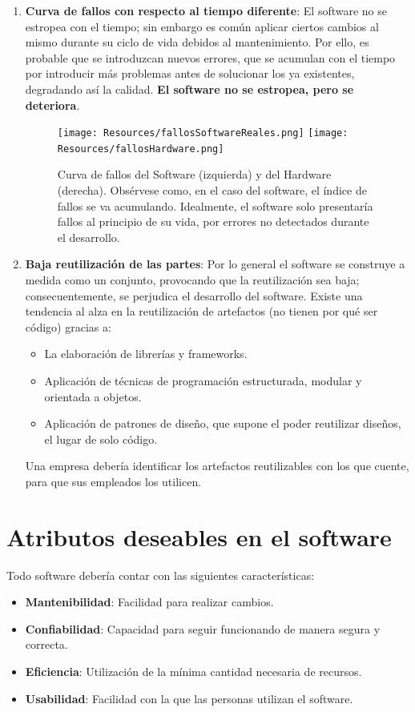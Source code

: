 \begin{enumerate}
    \item \textbf{Curva de fallos con respecto al tiempo diferente}:
          El software no se estropea con el tiempo; sin embargo es común aplicar ciertos cambios al mismo durante su ciclo de vida debidos al mantenimiento. Por ello, es probable que se introduzcan nuevos errores, que se acumulan con el tiempo por introducir más problemas antes de solucionar los ya existentes, degradando así la calidad. \textbf{El software no se estropea, pero se deteriora}.
          \begin{figure}[h]
            \centering
            \texttt{[image: Resources/fallosSoftwareReales.png]}
            \texttt{[image: Resources/fallosHardware.png]}
            \caption{Curva de fallos del Software (izquierda) y del Hardware (derecha). Obsérvese como, en el caso del software, el índice de fallos se va acumulando. Idealmente, el software solo presentaría fallos al principio de su vida, por errores no detectados durante el desarrollo.}
        \end{figure}
    \item \textbf{Baja reutilización de las partes}:
          Por lo general el software se construye a medida como un conjunto, provocando que la reutilización sea baja; consecuentemente, se perjudica el desarrollo del software. Existe una tendencia al alza en la reutilización de artefactos (no tienen por qué ser código) gracias a:
          \begin{itemize}
              \item La elaboración de librerías y frameworks.
              \item Aplicación de técnicas de programación estructurada, modular y orientada a objetos.
              \item Aplicación de patrones de diseño, que supone el poder reutilizar diseños, el lugar de solo código.
          \end{itemize}
          Una empresa debería identificar los artefactos reutilizables con los que cuente, para que sus empleados los utilicen.
\end{enumerate}

\section{Atributos deseables en el software}
Todo software debería contar con las siguientes características:
\begin{itemize}
    \item \textbf{Mantenibilidad}: Facilidad para realizar cambios.
    \item \textbf{Confiabilidad}: Capacidad para seguir funcionando de manera segura y correcta.
    \item \textbf{Eficiencia}: Utilización de la mínima cantidad necesaria de recursos.
    \item \textbf{Usabilidad}: Facilidad con la que las personas utilizan el software.
\end{itemize}

